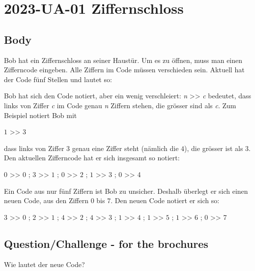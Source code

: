\documentclass[a4paper,11pt]{report}
\newcommand{\taskGraphicsFolder}{..}
\begin{document}
\section*{\centering{} 2023-UA-01 Ziffernschloss}


\subsection*{Body}

Bob hat ein Ziffernschloss an seiner Haustür.
Um es zu öffnen, muss man einen Zifferncode eingeben.
Alle Ziffern im Code müssen verschieden sein.
Aktuell hat der Code fünf Stellen und lautet so:

{\centering%
\par}

Bob hat sich den Code notiert, aber ein wenig verschleiert:
\emph{n} >\textcompwordmark{}> \emph{c}  bedeutet, dass links von Ziffer \emph{c} im Code genau \emph{n} Ziffern stehen,
die grösser sind als \emph{c}.  Zum Beispiel notiert Bob mit

$1$ >\textcompwordmark{}> 3

dass links von Ziffer $3$ genau eine Ziffer steht (nämlich die $4$), die grösser ist als $3$.
Den aktuellen Zifferncode hat er sich insgesamt so notiert:

$0$ >\textcompwordmark{}> $0$ ; $3$ >\textcompwordmark{}> $1$ ; $0$ >\textcompwordmark{}> $2$ ; $1$ >\textcompwordmark{}> $3$ ; $0$ >\textcompwordmark{}> 4

Ein Code aus nur fünf Ziffern ist Bob zu unsicher.
Deshalb überlegt er sich einen neuen Code, aus den Ziffern $0$ bis $7$.
Den neuen Code notiert er sich so:

$3$ >\textcompwordmark{}> $0$ ; $2$ >\textcompwordmark{}> $1$ ; $4$ >\textcompwordmark{}> $2$ ; $4$ >\textcompwordmark{}> $3$ ; $1$ >\textcompwordmark{}> $4$ ; $1$ >\textcompwordmark{}> $5$ ; $1$ >\textcompwordmark{}> $6$ ; $0$ >\textcompwordmark{}> 7

{\em


\subsection*{Question/Challenge - for the brochures}

Wie lautet der neue Code?

{\centering%
\par}

}
\end{document}
